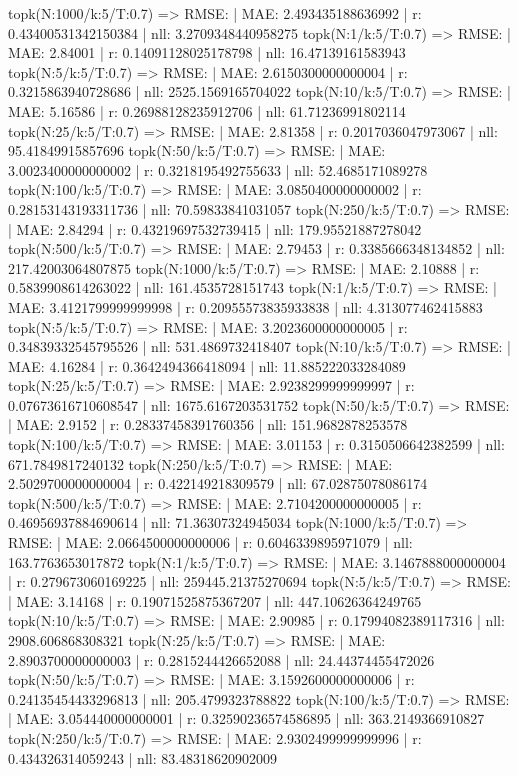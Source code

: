 topk(N:1000/k:5/T:0.7) => RMSE: | MAE: 2.493435188636992 | r: 0.43400531342150384 | nll: 3.2709348440958275
topk(N:1/k:5/T:0.7) => RMSE: | MAE: 2.84001 | r: 0.14091128025178798 | nll: 16.47139161583943
topk(N:5/k:5/T:0.7) => RMSE: | MAE: 2.6150300000000004 | r: 0.3215863940728686 | nll: 2525.1569165704022
topk(N:10/k:5/T:0.7) => RMSE: | MAE: 5.16586 | r: 0.26988128235912706 | nll: 61.71236991802114
topk(N:25/k:5/T:0.7) => RMSE: | MAE: 2.81358 | r: 0.2017036047973067 | nll: 95.41849915857696
topk(N:50/k:5/T:0.7) => RMSE: | MAE: 3.0023400000000002 | r: 0.3218195492755633 | nll: 52.4685171089278
topk(N:100/k:5/T:0.7) => RMSE: | MAE: 3.0850400000000002 | r: 0.28153143193311736 | nll: 70.59833841031057
topk(N:250/k:5/T:0.7) => RMSE: | MAE: 2.84294 | r: 0.43219697532739415 | nll: 179.95521887278042
topk(N:500/k:5/T:0.7) => RMSE: | MAE: 2.79453 | r: 0.3385666348134852 | nll: 217.42003064807875
topk(N:1000/k:5/T:0.7) => RMSE: | MAE: 2.10888 | r: 0.5839908614263022 | nll: 161.4535728151743
topk(N:1/k:5/T:0.7) => RMSE: | MAE: 3.4121799999999998 | r: 0.20955573835933838 | nll: 4.313077462415883
topk(N:5/k:5/T:0.7) => RMSE: | MAE: 3.2023600000000005 | r: 0.34839332545795526 | nll: 531.4869732418407
topk(N:10/k:5/T:0.7) => RMSE: | MAE: 4.16284 | r: 0.3642494366418094 | nll: 11.885222033284089
topk(N:25/k:5/T:0.7) => RMSE: | MAE: 2.9238299999999997 | r: 0.07673616710608547 | nll: 1675.6167203531752
topk(N:50/k:5/T:0.7) => RMSE: | MAE: 2.9152 | r: 0.28337458391760356 | nll: 151.9682878253578
topk(N:100/k:5/T:0.7) => RMSE: | MAE: 3.01153 | r: 0.3150506642382599 | nll: 671.7849817240132
topk(N:250/k:5/T:0.7) => RMSE: | MAE: 2.5029700000000004 | r: 0.422149218309579 | nll: 67.02875078086174
topk(N:500/k:5/T:0.7) => RMSE: | MAE: 2.7104200000000005 | r: 0.46956937884690614 | nll: 71.36307324945034
topk(N:1000/k:5/T:0.7) => RMSE: | MAE: 2.0664500000000006 | r: 0.6046339895971079 | nll: 163.7763653017872
topk(N:1/k:5/T:0.7) => RMSE: | MAE: 3.1467888000000004 | r: 0.279673060169225 | nll: 259445.21375270694
topk(N:5/k:5/T:0.7) => RMSE: | MAE: 3.14168 | r: 0.19071525875367207 | nll: 447.10626364249765
topk(N:10/k:5/T:0.7) => RMSE: | MAE: 2.90985 | r: 0.17994082389117316 | nll: 2908.606868308321
topk(N:25/k:5/T:0.7) => RMSE: | MAE: 2.8903700000000003 | r: 0.2815244426652088 | nll: 24.44374455472026
topk(N:50/k:5/T:0.7) => RMSE: | MAE: 3.1592600000000006 | r: 0.24135454433296813 | nll: 205.4799323788822
topk(N:100/k:5/T:0.7) => RMSE: | MAE: 3.054440000000001 | r: 0.32590236574586895 | nll: 363.2149366910827
topk(N:250/k:5/T:0.7) => RMSE: | MAE: 2.9302499999999996 | r: 0.434326314059243 | nll: 83.48318620902009
